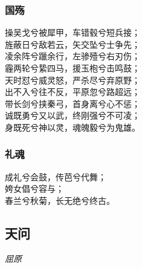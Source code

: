 \documentclass[]{article}
\begin{document}
\hypertarget{header-n61}{%
\subsubsection{国殇}\label{header-n61}}

操吴戈兮被犀甲，车错毂兮短兵接；\\
旌蔽日兮敌若云，矢交坠兮士争先；\\
凌余阵兮躐余行，左骖殪兮右刃伤；\\
霾两轮兮絷四马，援玉枹兮击鸣鼓；\\
天时怼兮威灵怒，严杀尽兮弃原野；\\
出不入兮往不反，平原忽兮路超远；\\
带长剑兮挟秦弓，首身离兮心不惩；\\
诚既勇兮又以武，终刚强兮不可凌；\\
身既死兮神以灵，魂魄毅兮为鬼雄。

\hypertarget{header-n66}{%
\subsubsection{礼魂}\label{header-n66}}

成礼兮会鼓，传芭兮代舞；\\
姱女倡兮容与；\\
春兰兮秋菊，长无绝兮终古。

\hypertarget{header-n70}{%
\subsection{天问}\label{header-n70}}

\emph{屈原}
\end{document}
